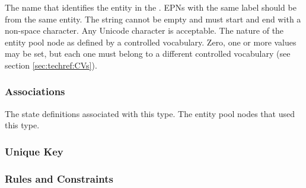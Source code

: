 \begin{attributes}
   The name that identifies the entity in the
  \PDm. EPNs with the same label should be from the same entity. The
  string cannot be empty and must start and end with a non-space
  character. Any Unicode character is acceptable.
   The nature of the entity pool node as defined
  by a controlled vocabulary. Zero, one or more values may be set, but
  each one must belong to a different controlled vocabulary (see
  section \ref{sec:techref:CVs}).
\end{attributes}


\subsubsection{Associations}

\begin{attributes}
   The state
  definitions associated with this type.
 The entity pool nodes that
used this type.
\end{attributes}

\subsubsection{Unique Key}

\begin{logicalkey}
  \item {}
  \item {}
\end{logicalkey}

\subsubsection{Rules and Constraints}

\begin{valrules}
\end{valrules}


